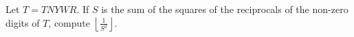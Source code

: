 Let $T=TNYWR$. If $S$ is the sum of the squares of the reciprocals of the non-zero digits of $T$, compute $\left\lfloor\frac{1}{S^2}\right\rfloor$.